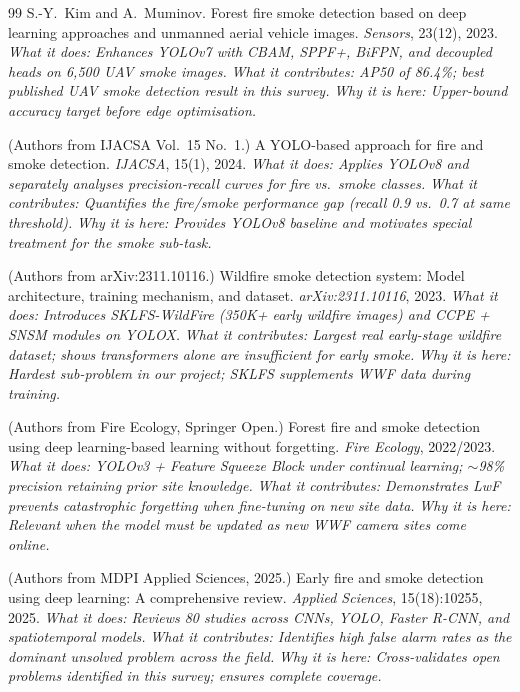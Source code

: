 \documentclass[11pt,twocolumn]{article}
\begin{document}
\begin{thebibliography}{99}
S.-Y.~Kim and A.~Muminov.
\newblock Forest fire smoke detection based on deep learning approaches
and unmanned aerial vehicle images.
\newblock \textit{Sensors}, 23(12), 2023.
\newblock \textit{What it does: Enhances YOLOv7 with CBAM, SPPF+,
BiFPN, and decoupled heads on 6,500 UAV smoke images.}
\newblock \textit{What it contributes: AP50 of 86.4\%; best published
UAV smoke detection result in this survey.}
\newblock \textit{Why it is here: Upper-bound accuracy target before
edge optimisation.}

(Authors from IJACSA Vol.~15 No.~1.)
\newblock A {YOLO}-based approach for fire and smoke detection.
\newblock \textit{IJACSA}, 15(1), 2024.
\newblock \textit{What it does: Applies YOLOv8 and separately analyses
precision-recall curves for fire vs.\ smoke classes.}
\newblock \textit{What it contributes: Quantifies the fire/smoke
performance gap (recall 0.9 vs.\ 0.7 at same threshold).}
\newblock \textit{Why it is here: Provides YOLOv8 baseline and
motivates special treatment for the smoke sub-task.}

(Authors from arXiv:2311.10116.)
\newblock Wildfire smoke detection system: Model architecture, training
mechanism, and dataset.
\newblock \textit{arXiv:2311.10116}, 2023.
\newblock \textit{What it does: Introduces SKLFS-WildFire (350K+ early
wildfire images) and CCPE + SNSM modules on YOLOX.}
\newblock \textit{What it contributes: Largest real early-stage wildfire
dataset; shows transformers alone are insufficient for early smoke.}
\newblock \textit{Why it is here: Hardest sub-problem in our project;
SKLFS supplements WWF data during training.}

(Authors from Fire Ecology, Springer Open.)
\newblock Forest fire and smoke detection using deep learning-based
learning without forgetting.
\newblock \textit{Fire Ecology}, 2022/2023.
\newblock \textit{What it does: YOLOv3 + Feature Squeeze Block under
continual learning; $\sim$98\% precision retaining prior site knowledge.}
\newblock \textit{What it contributes: Demonstrates LwF prevents
catastrophic forgetting when fine-tuning on new site data.}
\newblock \textit{Why it is here: Relevant when the model must be
updated as new WWF camera sites come online.}

(Authors from MDPI Applied Sciences, 2025.)
\newblock Early fire and smoke detection using deep learning: A
comprehensive review.
\newblock \textit{Applied Sciences}, 15(18):10255, 2025.
\newblock \textit{What it does: Reviews 80 studies across CNNs, YOLO,
Faster R-CNN, and spatiotemporal models.}
\newblock \textit{What it contributes: Identifies high false alarm rates
as the dominant unsolved problem across the field.}
\newblock \textit{Why it is here: Cross-validates open problems identified
in this survey; ensures complete coverage.}


\end{thebibliography}
\end{document}
